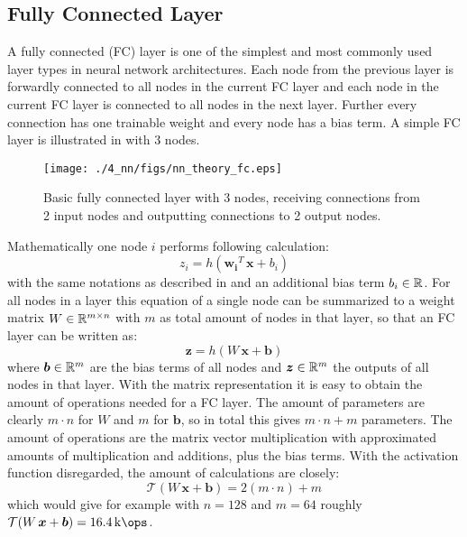 \subsection{Fully Connected Layer}
A fully connected (FC) layer is one of the simplest and most commonly used layer types in neural network architectures.
Each node from the previous layer is forwardly connected to all nodes in the current FC layer and each node in the current FC layer is connected to all nodes in the next layer.
Further every connection has one trainable weight and every node has a bias term.
A simple FC layer is illustrated in  with 3 nodes.
\begin{figure}[!ht]
  \centering
    \texttt{[image: ./4\_nn/figs/nn\_theory\_fc.eps]}
  \caption{Basic fully connected layer with 3 nodes, receiving connections from 2 input nodes and outputting connections to 2 output nodes.}
  \label{fig:nn_theory_fc}
\end{figure}
\FloatBarrier
\noindent
Mathematically one node $i$ performs following calculation:
\begin{equation}
  z_i = h(\bm{w_i}^T \, \bm{x} + b_i)
\end{equation}
with the same notations as described in  and an additional bias term $b_i \in \mathbb{R}$.
For all nodes in a layer this equation of a single node can be summarized to a weight matrix $W \in \mathbb{R}^{m \times n}$ with $m$ as total amount of nodes in that layer, so that an FC layer can be written as:
\begin{equation}
  \bm{z} = h(W \, \bm{x} + \bm{b})
\end{equation}
where $\bm{b} \in \mathbb{R}^m$ are the bias terms of all nodes and $\bm{z} \in \mathbb{R}^m$ the outputs of all nodes in that layer.
With the matrix representation it is easy to obtain the amount of operations needed for a FC layer.
The amount of parameters are clearly $m \cdot n$ for $W$ and $m$ for $\bm{b}$, so in total this gives $m \cdot n + m$ parameters.
The amount of operations are the matrix vector multiplication with approximated amounts of multiplication and additions, plus the bias terms.
With the activation function disregarded, the amount of calculations are closely:
\begin{equation} 
  \mathcal{T}(W \, \bm{x} + \bm{b}) = 2 (m \cdot n) + m
\end{equation}
which would give for example with $n = 128$ and $m = 64$ roughly $\mathcal{T}(W \, \bm{x} + \bm{b}) = \SI{16.4}{\kilo\ops}$.


